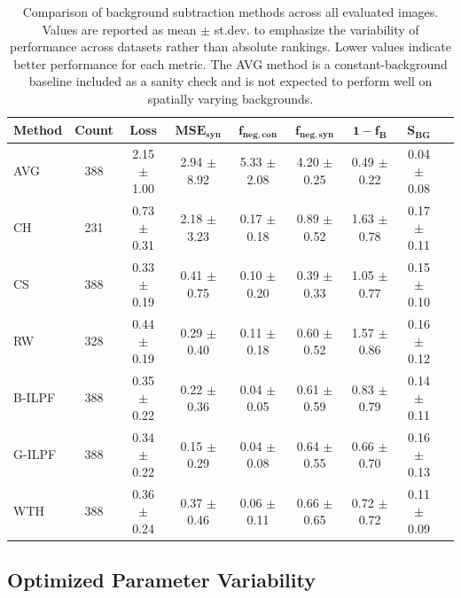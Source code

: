 \documentclass[iucr]{iucrjournals}
\begin{document}
\begin{table}[t]
\caption{Comparison of background subtraction methods across all evaluated images. Values are reported as mean $\pm$ st.dev. to emphasize the variability of performance across datasets rather than absolute rankings. Lower values indicate better performance for each metric. The AVG method is a constant-background baseline included as a sanity check and is not expected to perform well on spatially varying backgrounds.}
\label{tab:method_performance_new}
\centering
\small
\setlength{\tabcolsep}{3pt}
\renewcommand{\arraystretch}{1.1}
\begin{tabular}{@{}lcccccccc@{}}
\toprule
\textbf{Method} & \textbf{Count} & \textbf{Loss} &
$\mathbf{MSE}_{\mathbf{syn}}$ &
$\mathbf{f}_{\mathbf{neg,con}}$ &
$\mathbf{f}_{\mathbf{neg,syn}}$ &
$\mathbf{1-f_B}$ &
$\mathbf{S}_{\mathbf{BG}}$ \\ \midrule
AVG & 388 & 2.15 $\pm$ 1.00 & 2.94 $\pm$ 8.92 & 5.33 $\pm$ 2.08 & 4.20 $\pm$ 0.25 & 0.49 $\pm$ 0.22 & 0.04 $\pm$ 0.08 \\
CH & 231 & 0.73 $\pm$ 0.31 & 2.18 $\pm$ 3.23 & 0.17 $\pm$ 0.18 & 0.89 $\pm$ 0.52 & 1.63 $\pm$ 0.78 & 0.17 $\pm$ 0.11 \\
CS & 388 & 0.33 $\pm$ 0.19 & 0.41 $\pm$ 0.75 & 0.10 $\pm$ 0.20 & 0.39 $\pm$ 0.33 & 1.05 $\pm$ 0.77 & 0.15 $\pm$ 0.10 \\
RW & 328 & 0.44 $\pm$ 0.19 & 0.29 $\pm$ 0.40 & 0.11 $\pm$ 0.18 & 0.60 $\pm$ 0.52 & 1.57 $\pm$ 0.86 & 0.16 $\pm$ 0.12 \\
B-ILPF & 388 & 0.35 $\pm$ 0.22 & 0.22 $\pm$ 0.36 & 0.04 $\pm$ 0.05 & 0.61 $\pm$ 0.59 & 0.83 $\pm$ 0.79 & 0.14 $\pm$ 0.11 \\
G-ILPF & 388 & 0.34 $\pm$ 0.22 & 0.15 $\pm$ 0.29 & 0.04 $\pm$ 0.08 & 0.64 $\pm$ 0.55 & 0.66 $\pm$ 0.70 & 0.16 $\pm$ 0.13 \\
WTH & 388 & 0.36 $\pm$ 0.24 & 0.37 $\pm$ 0.46 & 0.06 $\pm$ 0.11 & 0.66 $\pm$ 0.65 & 0.72 $\pm$ 0.72 & 0.11 $\pm$ 0.09 \\
\bottomrule
\end{tabular}
\end{table}




\subsection{Optimized Parameter Variability}
\end{document}
